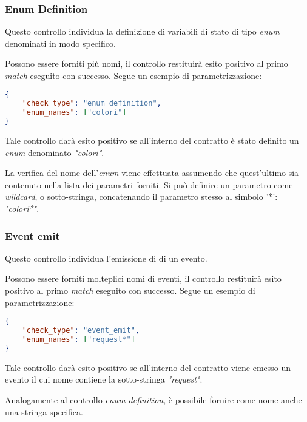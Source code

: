 \subsubsection{Enum Definition}
Questo controllo individua la definizione di variabili di stato di tipo \textit{enum} denominati in modo specifico.\par
Possono essere forniti più nomi, il controllo restituirà esito positivo al primo \textit{match} eseguito con successo.
Segue un esempio di parametrizzazione:
{\begin{lstlisting}[language=json, caption={Parametrizzazione del controllo Enum Definition}]
{
	"check_type": "enum_definition",
	"enum_names": ["colori"]
}\end{lstlisting}}
\noindent Tale controllo darà esito positivo se all'interno del contratto è stato definito un \textit{enum} denominato \textit{"colori"}.\par
La verifica del nome dell'\textit{enum} viene effettuata assumendo che quest'ultimo sia contenuto nella lista dei parametri forniti. Si può definire un parametro come \textit{wildcard}, o sotto-stringa, concatenando il parametro stesso al simbolo '*': \textit{"colori*"}.


\subsubsection{Event emit}
Questo controllo individua l'emissione di di un evento.\par
Possono essere forniti molteplici nomi di eventi, il controllo restituirà esito positivo al primo \textit{match} eseguito con successo.
Segue un esempio di parametrizzazione:
{\begin{lstlisting}[language=json, caption={Parametrizzazione del controllo Event Emit}]
{
	"check_type": "event_emit",
	"enum_names": ["request*"]
}\end{lstlisting}}
\noindent Tale controllo darà esito positivo se all'interno del contratto viene emesso un evento il cui nome contiene la sotto-stringa \textit{"request"}.\par
Analogamente al controllo \textit{enum definition}, è possibile fornire come nome anche una stringa specifica.

